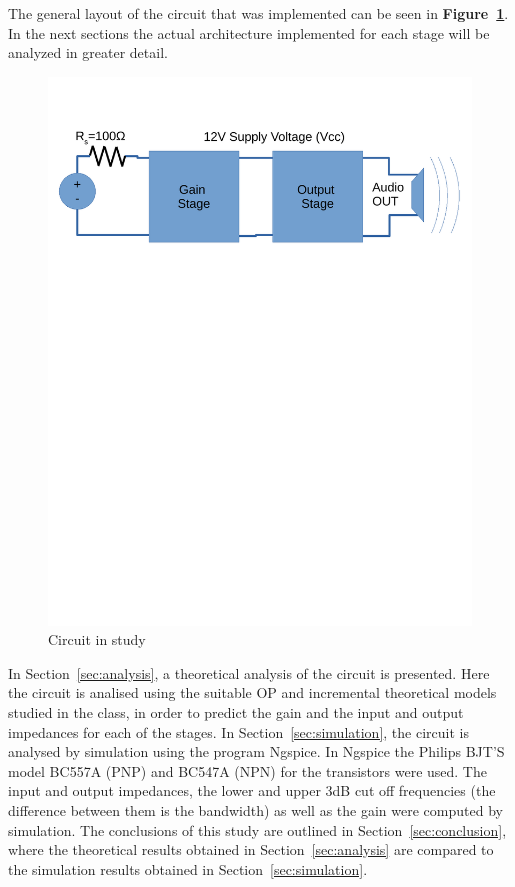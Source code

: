 The general layout of the circuit that was implemented can be seen in \textbf{Figure~\ref{fig:circuit_t4}}. In the next sections the actual architecture implemented for each stage will be analyzed in greater detail.\par
\begin{figure}[h] \centering
\includegraphics[width=0.6\linewidth]{circuit_t4.pdf}
\vspace{-6cm}
\caption{Circuit in study}
\label{fig:circuit_t4}
\end{figure}


In Section~\ref{sec:analysis}, a theoretical analysis of the circuit is
presented. Here the circuit is analised using the suitable OP and incremental theoretical models studied in the class, in order to predict the gain and the input and output impedances for each of the stages.
In Section~\ref{sec:simulation}, the circuit is analysed by
simulation using the program Ngspice. In Ngspice the Philips BJT'S model BC557A (PNP) and BC547A (NPN) for the transistors were used. The input and output impedances, the lower and upper 3dB cut off frequencies (the difference between them is the bandwidth) as well as the gain were computed by simulation. The conclusions of this study are outlined in
Section~\ref{sec:conclusion}, where the theoretical results obtained in
Section~\ref{sec:analysis} are compared to the simulation results obtained in
Section~\ref{sec:simulation}.





\pagebreak


